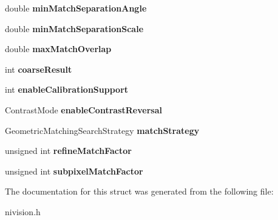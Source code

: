 \begin{DoxyCompactItemize}
\item 
\hypertarget{structMatchGeometricPatternAdvancedOptions3__struct_aa2e21765f5a280c33f3ce917a8c33e2e}{
double {\bfseries minMatchSeparationAngle}}
\label{structMatchGeometricPatternAdvancedOptions3__struct_aa2e21765f5a280c33f3ce917a8c33e2e}

\item 
\hypertarget{structMatchGeometricPatternAdvancedOptions3__struct_ad4b76530180cd56f6d0c587035380c32}{
double {\bfseries minMatchSeparationScale}}
\label{structMatchGeometricPatternAdvancedOptions3__struct_ad4b76530180cd56f6d0c587035380c32}

\item 
\hypertarget{structMatchGeometricPatternAdvancedOptions3__struct_a1e83d82cfed0ec9ea34e2f670eb73e80}{
double {\bfseries maxMatchOverlap}}
\label{structMatchGeometricPatternAdvancedOptions3__struct_a1e83d82cfed0ec9ea34e2f670eb73e80}

\item 
\hypertarget{structMatchGeometricPatternAdvancedOptions3__struct_a688dd4abc6d957fdb00b4530db31c351}{
int {\bfseries coarseResult}}
\label{structMatchGeometricPatternAdvancedOptions3__struct_a688dd4abc6d957fdb00b4530db31c351}

\item 
\hypertarget{structMatchGeometricPatternAdvancedOptions3__struct_a367c3920c4d78c3895633f02f310b21a}{
int {\bfseries enableCalibrationSupport}}
\label{structMatchGeometricPatternAdvancedOptions3__struct_a367c3920c4d78c3895633f02f310b21a}

\item 
\hypertarget{structMatchGeometricPatternAdvancedOptions3__struct_a6634a3a349107d31905a28856e931ed1}{
ContrastMode {\bfseries enableContrastReversal}}
\label{structMatchGeometricPatternAdvancedOptions3__struct_a6634a3a349107d31905a28856e931ed1}

\item 
\hypertarget{structMatchGeometricPatternAdvancedOptions3__struct_ab9a01faf07c185af757e29de96b5d710}{
GeometricMatchingSearchStrategy {\bfseries matchStrategy}}
\label{structMatchGeometricPatternAdvancedOptions3__struct_ab9a01faf07c185af757e29de96b5d710}

\item 
\hypertarget{structMatchGeometricPatternAdvancedOptions3__struct_ae40cd2298f0435d49e1da350611eddbf}{
unsigned int {\bfseries refineMatchFactor}}
\label{structMatchGeometricPatternAdvancedOptions3__struct_ae40cd2298f0435d49e1da350611eddbf}

\item 
\hypertarget{structMatchGeometricPatternAdvancedOptions3__struct_a42de9761a463b06bebfcff1f201e7cdb}{
unsigned int {\bfseries subpixelMatchFactor}}
\label{structMatchGeometricPatternAdvancedOptions3__struct_a42de9761a463b06bebfcff1f201e7cdb}

\end{DoxyCompactItemize}


The documentation for this struct was generated from the following file:\begin{DoxyCompactItemize}
\item 
nivision.h\end{DoxyCompactItemize}
